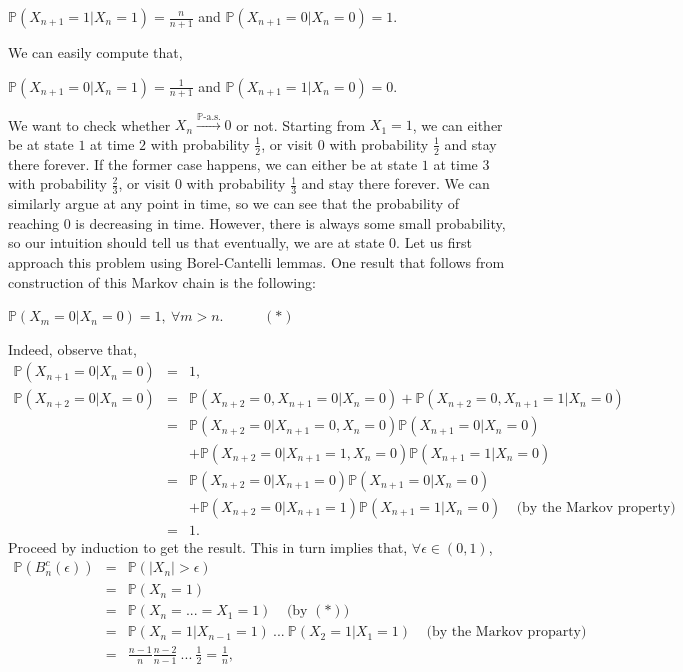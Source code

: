 \documentclass{article}
\begin{document}
\begin{center}
	$\mathbb{P}(X_{n+1} = 1| X_n = 1) = \frac{n}{n+1}$ and $\mathbb{P}(X_{n+1} = 0| X_n = 0) = 1$.
\end{center}
We can easily compute that,
\begin{center}
	$\mathbb{P}(X_{n+1} = 0| X_n = 1) = \frac{1}{n+1}$ and $\mathbb{P}(X_{n+1} = 1| X_n = 0) = 0$.
\end{center}
We want to check whether $X_n \xrightarrow{\mathbb{P}\text{-a.s.}} 0$ or not. Starting from $X_1 = 1$, we can either be at state $1$ at time $2$ with probability $\frac{1}{2}$, or visit $0$ with probability $\frac{1}{2}$ and stay there forever. If the former case happens, we can either be at state $1$ at time $3$ with probability $\frac{2}{3}$, or visit $0$ with probability $\frac{1}{3}$ and stay there forever. We can similarly argue at any point in time, so we can see that the probability of reaching $0$ is decreasing in time. However, there is always some small probability, so our intuition should tell us that eventually, we are at state $0$. Let us first approach this problem using Borel-Cantelli lemmas. One result that follows from construction of this Markov chain is the following:
\begin{center}
	$\mathbb{P}(X_m = 0| X_n = 0) = 1, \ \forall m > n$. \ \ \ \ \ $(*)$
\end{center}
Indeed, observe that,
\begin{eqnarray}
	\nonumber
	\mathbb{P}(X_{n+1} = 0| X_n = 0) &=& 1,\\
	\nonumber
	\mathbb{P}(X_{n+2} = 0| X_n = 0) &=& \mathbb{P}(X_{n+2} = 0, X_{n+1} = 0| X_n = 0) + \mathbb{P}(X_{n+2} = 0, X_{n+1} = 1| X_n = 0)\\
	\nonumber
	&=& \mathbb{P}(X_{n+2} = 0| X_{n+1} = 0, X_n = 0)\mathbb{P}(X_{n+1} = 0| X_n = 0) \\
	\nonumber
	&{}& + \mathbb{P}(X_{n+2} = 0| X_{n+1} = 1, X_n = 0)\mathbb{P}(X_{n+1} = 1| X_n = 0)\\
	\nonumber
	&=& \mathbb{P}(X_{n+2} = 0| X_{n+1} = 0)\mathbb{P}(X_{n+1} = 0| X_n = 0) \\
	\nonumber
	&{}& + \mathbb{P}(X_{n+2} = 0| X_{n+1} = 1)\mathbb{P}(X_{n+1} = 1| X_n = 0) \ \ \ \ \ \text{(by the Markov property)}\\
	\nonumber
	&=& 1.
\end{eqnarray}
Proceed by induction to get the result. This in turn implies that, $\forall \epsilon \in (0,1)$,
\begin{eqnarray}
\nonumber
\mathbb{P}(B_n^c(\epsilon)) &=& \mathbb{P}(|X_n| > \epsilon) \\
\nonumber
&=& \mathbb{P}(X_n = 1) \\
\nonumber
&=& \mathbb{P}(X_n = ... = X_1 = 1) \ \ \ \ \ \text{(by $(*)$)}\\
\nonumber
&=& \mathbb{P}(X_n = 1| X_{n-1} = 1) \ ... \ \mathbb{P}(X_2 = 1| X_1 = 1) \ \ \ \ \ \text{(by the Markov proparty)}\\
\nonumber
&=& \frac{n-1}{n}\frac{n-2}{n-1} \ ... \ \frac{1}{2} = \frac{1}{n},
\end{eqnarray}
\end{document}
